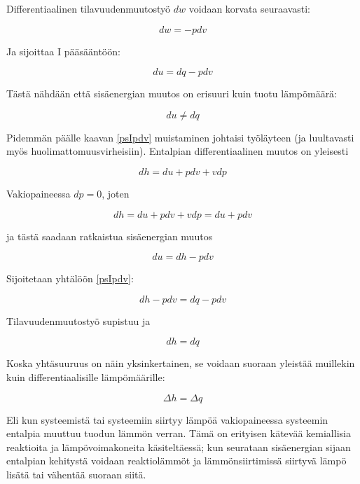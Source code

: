 \documentclass[12pt,a4paper,finnish]{book}
\begin{document}
Differentiaalinen tilavuudenmuutostyö $dw$ voidaan korvata seuraavasti:

\begin{equation}
 dw = -pdv
\end{equation}

Ja sijoittaa I pääsääntöön:

\begin{equation}
\label{psIpdv}
 du = dq - pdv
\end{equation}

Tästä nähdään että sisäenergian muutos on erisuuri kuin tuotu lämpömäärä:

\begin{equation}
 du \neq dq
\end{equation}

Pidemmän päälle kaavan \ref{psIpdv} muistaminen johtaisi työläyteen (ja luultavasti myös huolimattomuusvirheisiin). Entalpian 
differentiaalinen muutos on yleisesti

\begin{equation}
 dh = du + pdv + vdp
\end{equation}

Vakiopaineessa $dp = 0$, joten

\begin{equation}
 dh = du + pdv + vdp = du + pdv 
\end{equation}

ja tästä saadaan ratkaistua sisäenergian muutos

\begin{equation}
 du = dh - pdv
\end{equation}

Sijoitetaan yhtälöön \ref{psIpdv}:

\begin{equation}
 dh - pdv = dq - pdv
\end{equation}

Tilavuudenmuutostyö supistuu ja

\begin{equation}
 dh = dq
\end{equation}

Koska yhtäsuuruus on näin yksinkertainen, se voidaan suoraan yleistää muillekin kuin differentiaalisille lämpömäärille:

\begin{equation}
 \Delta h = \Delta q
\end{equation}

Eli kun systeemistä tai systeemiin siirtyy lämpöä vakiopaineessa systeemin entalpia muuttuu tuodun lämmön verran. Tämä 
on erityisen kätevää kemiallisia reaktioita ja lämpövoimakoneita käsiteltäessä; kun seurataan sisäenergian sijaan 
entalpian kehitystä voidaan reaktiolämmöt ja lämmönsiirtimissä siirtyvä lämpö lisätä tai vähentää suoraan siitä.
\end{document}
